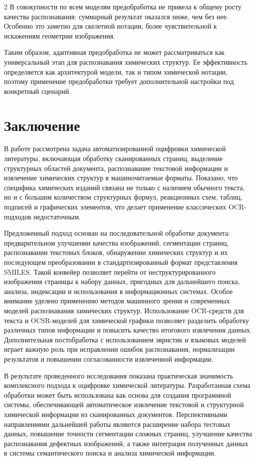 \documentclass[11pt]{article}
\begin{document}
\begin{multicols}{2}
В совокупности по всем моделям предобработка не привела к общему росту качества распознавания: суммарный результат оказался ниже, чем без нее. Особенно это заметно для скелетной нотации, более чувствительной к искажениям геометрии изображения.

Таким образом, адаптивная предобработка не может рассматриваться как универсальный этап для распознавания химических структур. Ее эффективность определяется как архитектурой модели, так и типом химической нотации, поэтому применение предобработки требует дополнительной настройки под конкретный сценарий. 
\section{Заключение}
В работе рассмотрена задача автоматизированной оцифровки химической литературы, включающая обработку сканированных страниц, выделение структурных областей документа, распознавание текстовой информации и извлечение химических структур в машиночитаемые форматы. Показано, что специфика химических изданий связана не только с наличием обычного текста, но и с большим количеством структурных формул, реакционных схем, таблиц, подписей и графических элементов, что делает применение классических OCR-подходов недостаточным.

Предложенный подход основан на последовательной обработке документа: предварительном улучшении качества изображений, сегментации страниц, распознавании текстовых блоков, обнаружении химических структур и их последующем преобразовании в стандартизированный формат представления SMILES. Такой конвейер позволяет перейти от неструктурированного изображения страницы к набору данных, пригодных для дальнейшего поиска, анализа, индексации и использования в информационных системах.
Особое внимание уделено применению методов машинного зрения и современных моделей распознавания химических структур. Использование OCR-средств для текста и OCSR-моделей для химической графики позволяет разделить обработку различных типов информации и повысить качество итогового извлечения данных. Дополнительная постобработка с использованием эвристик и языковых моделей играет важную роль при исправлении ошибок распознавания, нормализации результатов и повышении согласованности извлеченной информации.

В результате проведенного исследования показана практическая значимость комплексного подхода к оцифровке химической литературы. Разработанная схема обработки может быть использована как основа для создания программной системы, обеспечивающей автоматическое извлечение текстовой и структурной химической информации из сканированных документов. Перспективными направлениями дальнейшей работы являются расширение набора тестовых данных, повышение точности сегментации сложных страниц, улучшение качества распознавания дефектных изображений, а также интеграция полученных данных в системы семантического поиска и анализа химической информации.  


\end{multicols}
\end{document}
